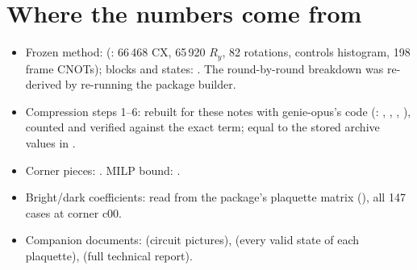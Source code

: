 \documentclass[11pt]{article}
\begin{document}
\section{Where the numbers come from}\label{sec:sources}\sloppy
\begin{itemize}[itemsep=1pt]
\item Frozen method:  (: 66\,468 CX,
65\,920 $R_y$, 82 rotations, controls histogram, 198 frame CNOTs); blocks and states:
.  The round-by-round breakdown was re-derived by re-running the package
builder.
\item Compression steps 1--6: rebuilt for these notes with genie-opus's code
(: , ,
, ), counted and verified against the exact term; equal to the stored
archive values in .
\item Corner pieces: .  MILP bound: .
\item Bright/dark coefficients: read from the package's plaquette matrix (),
all 147 cases at corner c00.
\item Companion documents:  (circuit pictures),
 (every valid state of each plaquette),
 (full technical report).
\end{itemize}

\appendix
\end{document}
